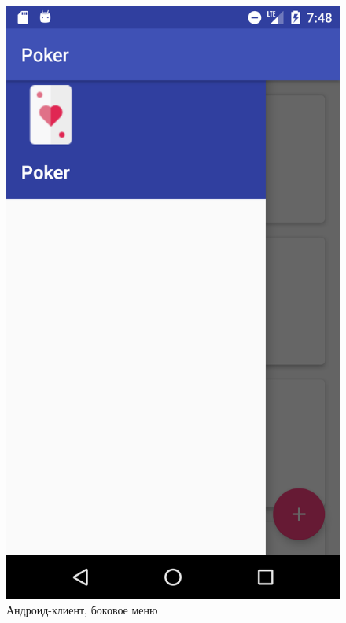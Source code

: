 \begin{figure}[H]
	\begin{center}
		\includegraphics[scale=0.15]{pics/andr2}
	    \caption{Андроид-клиент, боковое меню} 
		\label{pic:andr:2}
	\end{center}
\end{figure}

